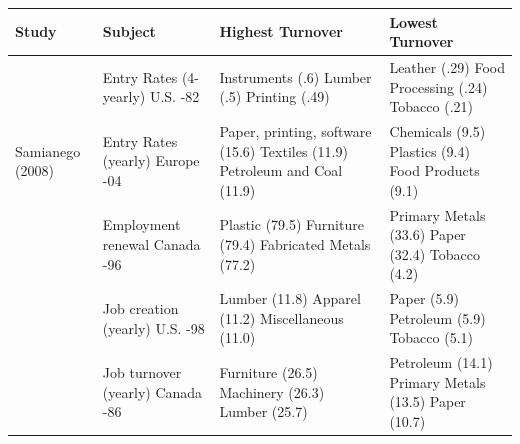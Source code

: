 \documentclass[a4paper,12pt]{article}
\begin{document}
\begin{center}
\begin{table}\label{tb:market_lit}
\begin{tabular}{|P{2.8cm}|P{4cm}|P{4cm}|P{4cm}|}
\hline
\textbf{Study}  &  \textbf{Subject}  &  \textbf{Highest Turnover}  & \textbf{Lowest Turnover} \\
\hline 
\hline
\citet{Dunne1988} & Entry Rates (4-yearly) \newline U.S. -82    & Instruments (.6) \newline Lumber (.5) \newline Printing (.49)  & Leather (.29) \newline  Food Processing (.24) \newline Tobacco (.21) \\  
\hline
Samianego (2008)   & Entry Rates (yearly)  \newline Europe -04  & Paper, printing, software (15.6) \newline Textiles (11.9) \newline Petroleum and Coal (11.9) & Chemicals (9.5) \newline Plastics (9.4) \newline Food Products (9.1) \\
\hline 
\citet{Brown2004}  & Employment renewal    \newline Canada -96  & Plastic (79.5) \newline Furniture (79.4) \newline Fabricated Metals (77.2) & Primary Metals (33.6) \newline Paper (32.4) \newline Tobacco (4.2) \\
\hline
\citet{Foster2006} & Job creation (yearly) \newline U.S. -98     & Lumber (11.8) \newline Apparel (11.2) \newline Miscellaneous (11.0) & Paper (5.9) \newline Petroleum (5.9) \newline Tobacco (5.1) \\
\hline
\citet{Baldwin1994} & Job turnover (yearly) \newline Canada -86 & Furniture (26.5) \newline Machinery (26.3) \newline Lumber (25.7) & Petroleum (14.1) \newline Primary Metals (13.5) \newline Paper (10.7)  \\

\end{tabular}
\end{table}
\end{center}
\end{document}
